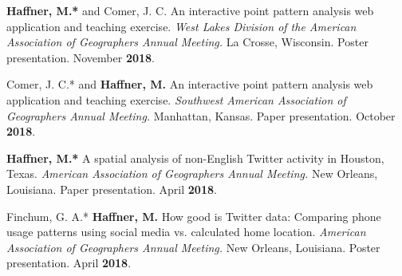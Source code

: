 \begin{cventries}
   \cventry
      {}
      {}
      {}
      {}
      {
        \begin{cvitems}
          \vspace{-2mm}
        \item {\textbf{Haffner, M.*} and Comer, J. C.  An interactive
            point pattern analysis web application and teaching exercise.
             \textit{West Lakes Division of the American Association of Geographers Annual
               Meeting.} La Crosse, Wisconsin.
            Poster presentation. November \textbf{2018}.}
          \end{cvitems}
        } %

   \cventry
      {}
      {}
      {}
      {}
      {
        \begin{cvitems}
          \vspace{-2mm}
        \item {Comer, J. C.* and \textbf{Haffner, M.} An interactive
            point pattern analysis web application and teaching exercise.
             \textit{Southwest American Association of Geographers Annual
               Meeting.} Manhattan, Kansas.
            Paper presentation. October \textbf{2018}.}
          \end{cvitems}
        } %

   \cventry
      {}
      {}
      {}
      {}
      {
        \begin{cvitems}
          \vspace{-2mm}
        \item {\textbf{Haffner, M.*} A spatial analysis of non-English Twitter
            activity in Houston, Texas.
             \textit{American Association of Geographers Annual Meeting.} New Orleans, Louisiana.
            Paper presentation. April \textbf{2018}.}
          \end{cvitems}
        } %

   \cventry
      {}
      {}
      {}
      {}
      {
        \begin{cvitems}
          \vspace{-2mm}
        \item {Finchum, G. A.* \textbf{Haffner, M.} How good is Twitter data:
            Comparing phone usage patterns using social media vs. calculated
            home location.
             \textit{American Association of Geographers Annual Meeting.} New Orleans, Louisiana.
            Poster presentation. April \textbf{2018}.}
          \end{cvitems}
        } %


\end{cventries}
